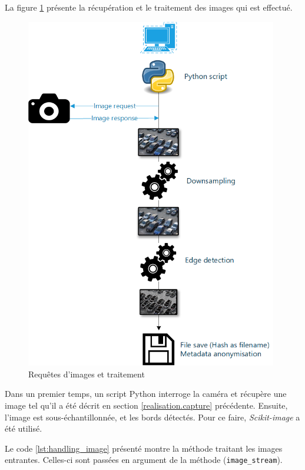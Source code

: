 La figure \ref{fig:image_process} présente la récupération et le traitement des images qui est effectué.

\begin{figure}[ht]
    \includegraphics[width=110mm]{img/realisation/image_process.png}
    \centering
    \caption{Requêtes d'images et traitement}
    \label{fig:image_process}
\end{figure} 

Dans un premier temps, un script Python interroge la caméra et récupère une image tel qu'il a été décrit en section \ref{realisation.capture} précédente. Ensuite, l'image est sous-échantillonnée, et les bords détectés. Pour ce faire, \textit{Scikit-image} a été utilisé.

Le code \ref{lst:handling_image} présenté montre la méthode traitant les images entrantes. Celles-ci sont passées en argument de la méthode (\lstinline[columns=fixed]{image_stream}).



